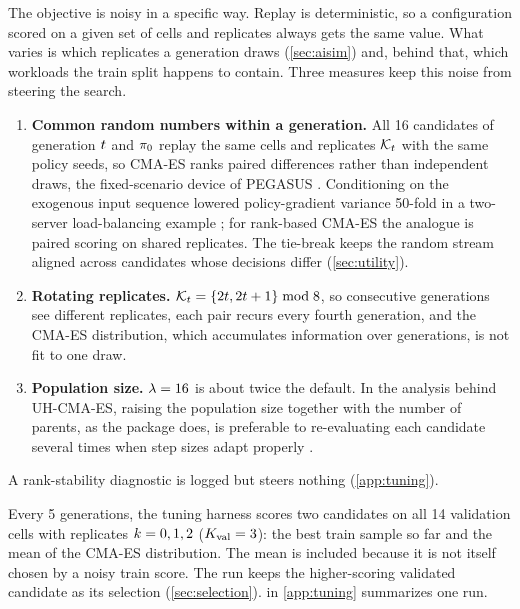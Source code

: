 The objective is noisy in a specific way. Replay is deterministic, so a configuration scored on a
given set of cells and replicates always gets the same value. What varies is which replicates a
generation draws (\cref{sec:aisim}) and, behind that, which workloads the train split happens to
contain. Three measures keep this noise from steering the search.
\begin{enumerate}
  \item \textbf{Common random numbers within a generation.} All 16 candidates of generation $t$
    and $\pi_{0}$ replay the same cells and replicates $\mathcal{K}_{t}$ with the same policy seeds, so
    CMA-ES ranks paired differences rather than independent draws, the fixed-scenario device of
    PEGASUS \citep{ng2000pegasus}. Conditioning on the exogenous input sequence lowered
    policy-gradient variance 50-fold in a two-server load-balancing example
    \citep{mao2019inputdriven}; for rank-based CMA-ES the analogue is paired scoring on shared
    replicates. The  tie-break keeps the random stream aligned across candidates
    whose decisions differ (\cref{sec:utility}).
  \item \textbf{Rotating replicates.} $\mathcal{K}_{t} = \{2t, 2t+1\} \bmod 8$, so consecutive
    generations see different replicates, each pair recurs every fourth generation, and the CMA-ES
    distribution, which accumulates information over generations, is not fit to one draw.
  \item \textbf{Population size.} $\lambda = 16$ is about twice the default. In the analysis
    behind UH-CMA-ES, raising the population size together with the number of parents, as the
    package does, is preferable to re-evaluating each candidate several times when step sizes adapt
    properly \citep{hansen2009uh}.
\end{enumerate}
A rank-stability diagnostic is logged but steers nothing (\cref{app:tuning}).

Every 5 generations, the tuning harness scores two candidates on all 14 validation cells with
replicates $k = 0,1,2$ ($K_{\mathrm{val}} = 3$): the best train sample so far and the mean of the CMA-ES
distribution. The mean is included because it is not itself chosen by a noisy train score. The
run keeps the higher-scoring validated candidate as its selection (\cref{sec:selection}).
 in \cref{app:tuning} summarizes one run.

